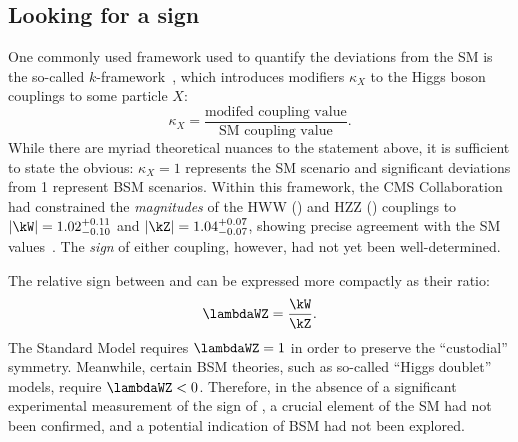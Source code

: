 \subsection{Looking for a sign}
One commonly used framework used to quantify the deviations from the SM is the so-called $k$-framework~\cite{KFrame}, which introduces modifiers $\kappa_X$ to the Higgs boson couplings to some particle $X$:
\begin{equation}
    \kappa_X = \frac{\text{modifed coupling value}}{\text{SM coupling value}}.
\end{equation}
While there are myriad theoretical nuances to the statement above, it is sufficient to state the obvious: $\kappa_X = 1$ represents the SM scenario and significant deviations from 1 represent BSM scenarios. 
Within this framework, the CMS Collaboration had constrained the \textit{magnitudes} of the HWW (\kW) and HZZ (\kZ) couplings to $|\kW| = 1.02^{+0.11}_{-0.10}$ and $|\kZ| = 1.04^{+0.07}_{-0.07}$, showing precise agreement with the SM values~\cite{NatureHiggsCMS2022}. 
The \textit{sign} of either coupling, however, had not yet been well-determined. 

The relative sign between \kW and \kZ can be expressed more compactly as their ratio:
\begin{equation}
    \lambdaWZ = \frac{\kW}{\kZ}.
\end{equation}
The Standard Model requires $\lambdaWZ = 1$ in order to preserve the ``custodial'' symmetry. 
Meanwhile, certain BSM theories, such as so-called ``Higgs doublet'' models, require $\lambdaWZ < 0$. 
Therefore, in the absence of a significant experimental measurement of the sign of \lambdaWZ, a crucial element of the SM had not been confirmed, and a potential indication of BSM had not been explored. 

